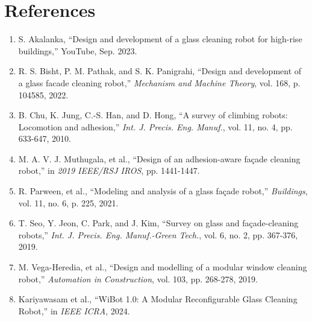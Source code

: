 \documentclass[12pt, a4paper]{article}
\begin{document}
\newpage
\section*{References}
\begin{enumerate}
    \item S. Akalanka, ``Design and development of a glass cleaning robot for high-rise buildings,'' YouTube, Sep. 2023.
    \item R. S. Bisht, P. M. Pathak, and S. K. Panigrahi, ``Design and development of a glass facade cleaning robot,'' \textit{Mechanism and Machine Theory}, vol. 168, p. 104585, 2022.
    \item B. Chu, K. Jung, C.-S. Han, and D. Hong, ``A survey of climbing robots: Locomotion and adhesion,'' \textit{Int. J. Precis. Eng. Manuf.}, vol. 11, no. 4, pp. 633-647, 2010.
    \item M. A. V. J. Muthugala, et al., ``Design of an adhesion-aware façade cleaning robot,'' in \textit{2019 IEEE/RSJ IROS}, pp. 1441-1447.
    \item R. Parween, et al., ``Modeling and analysis of a glass façade robot,'' \textit{Buildings}, vol. 11, no. 6, p. 225, 2021.
    \item T. Seo, Y. Jeon, C. Park, and J. Kim, ``Survey on glass and façade-cleaning robots,'' \textit{Int. J. Precis. Eng. Manuf.-Green Tech.}, vol. 6, no. 2, pp. 367-376, 2019.
    \item M. Vega-Heredia, et al., ``Design and modelling of a modular window cleaning robot,'' \textit{Automation in Construction}, vol. 103, pp. 268-278, 2019.
    \item Kariyawasam et al., ``WiBot 1.0: A Modular Reconfigurable Glass Cleaning Robot,'' in \textit{IEEE ICRA}, 2024.
\end{enumerate}
\end{document}
